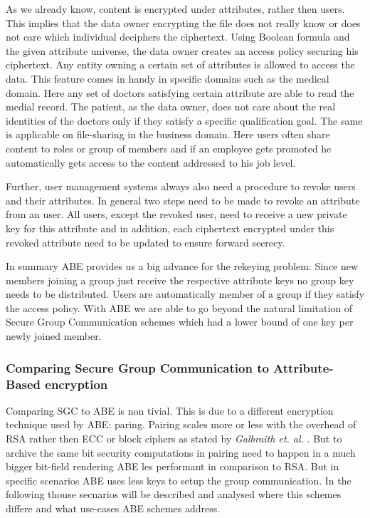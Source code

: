 As we already know, content is encrypted under attributes, rather then users. This implies that the data owner encrypting the file does not really know or does not care which individual deciphers the ciphertext. Using Boolean formula and the given attribute universe, the data owner creates an access policy securing his ciphertext. Any entity owning a certain set of attributes is allowed to access the data. This feature comes in handy in specific domains such as the medical domain. Here any set of doctors satisfying certain attribute are able to read the medial record. The patient, as the data owner, does not care about the real identities of the doctors only if they satisfy a specific qualification goal. The same is applicable on file-sharing in the business domain. Here users often share content to roles or group of members and if an employee gets promoted he automatically gets access to the content addressed to his job level. 

Further, user management systems always also need a procedure to revoke users and their attributes. 
In general two steps need to be made to revoke an attribute from an user. All users, except the revoked user, need to receive a new private key for this attribute and in addition, each ciphertext encrypted under this revoked attribute need to be updated to ensure forward secrecy. 

In summary ABE provides us a big advance for the rekeying problem: Since new members joining a group just receive the respective attribute keys no group key needs to be distributed. Users are automatically member of a group if they satisfy the access policy. With \ac{ABE} we are able to go beyond the natural limitation of Secure Group Communication schemes which had a lower bound of one key per newly joined member.  

\subsubsection{Comparing Secure Group Communication to Attribute-Based encryption}
Comparing \ac{SGC} to \ac{ABE} is non tivial. This is due to a different encryption technique used by \ac{ABE}: paring. Pairing scales more or less with the overhead of \ac{RSA} rather then \ac{ECC} or block ciphers as stated by \textit{Galbraith et. al.} \cite{galbraith2008pairings}. But to archive the same bit security computations in pairing need to happen in a much bigger bit-field rendering \ac{ABE} les performant in comparison to \ac{RSA}. But in specific scenarios \ac{ABE} uses less keys to setup the group communication. In the following thouse secnarios will be described and analysed where this schemes differe and what use-cases \ac{ABE} schemes address.


